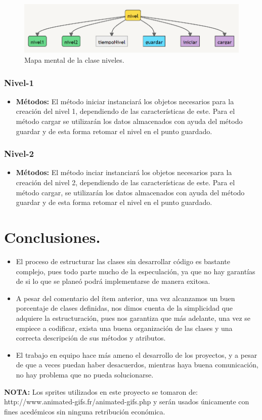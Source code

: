 \documentclass{article}
\begin{document}
\begin{figure}[h]
\includegraphics[scale=0.8]{Images/niveles.png}
\centering
\caption{Mapa mental de la clase niveles.}
\label{fig:mmniveles}
\end{figure}

    \subsubsection{Nivel-1}
    \begin{itemize}
        \item \textbf{Métodos:} El método iniciar instanciará los objetos necesarios para la creación del nivel 1, dependiendo de las características de este. Para el método cargar se utilizarán los datos almacenados con ayuda del método guardar y de esta forma retomar el nivel en el punto guardado.
    \end{itemize} 
    
    \subsubsection{Nivel-2}
    \begin{itemize}
        \item \textbf{Métodos:} El método inciar instanciará los objetos necesarios para la creación del nivel 2, dependiendo de las características de este. Para el método cargar, se utilizarán los datos almacenados con ayuda del método guardar y de esta forma retomar el nivel en el punto guardado.
    \end{itemize}
    

\section{Conclusiones.}
    \begin{itemize}
        \item El proceso de estructurar las clases sin desarrollar código es bastante complejo, pues todo parte mucho de la especulación, ya que no hay garantías de si lo que se planeó podrá implementarse de manera exitosa.
        
        \item A pesar del comentario del ítem anterior, una vez alcanzamos un buen porcentaje de clases definidas, nos dimos cuenta de la simplicidad que adquiere la estructuración, pues nos garantiza que más adelante, una vez se empiece a codificar, exista una buena organización de las clases y una correcta descripción de sus métodos y atributos.
        
        \item El trabajo en equipo hace más ameno el desarrollo de los proyectos, y a pesar de que a veces puedan haber desacuerdos, mientras haya buena comunicación, no hay problema que no pueda solucionarse.
    \end{itemize}
    
    \vspace{10mm}
    
\textbf{NOTA:} Los sprites utilizados en este proyecto se tomaron de: http://www.animated-gifs.fr/animated-gifs.php y serán usados únicamente con fines acedémicos sin ninguna retribución económica.
\end{document}
